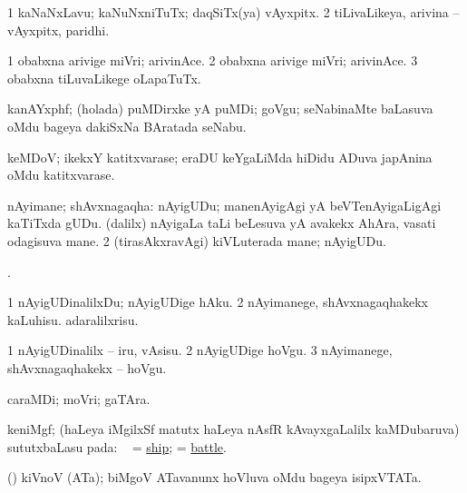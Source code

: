 \bentry
{}
\gl{\nA}
\bmng
\bnum
\num{1} kaNaNxLavu; kaNuNxniTuTx; daqSiTx(ya) vAyxpitx. 
\num{2} tiLivaLikeya, arivina -- vAyxpitx, paridhi. 
\enum
\emng

\noindent
\gl{\pagu}
\bmng
\bnum
\num{1}  obabxna arivige miVri; arivinAce. 
\num{2}  obabxna arivige miVri; arivinAce. 
\num{3}  obabxna tiLuvaLikege oLapaTuTx. 
\enum
\emng
\eentry

\bentry
{}
\gl{\nA}
\bmng
kanAYxphf; (holada) puMDirxke yA puMDi; goVgu; seNabinaMte baLasuva oMdu bageya dakiSxNa BAratada seNabu. 
\emng
\eentry

\bentry
{}
\gl{\nA}
\bmng
keMDoV; ikekxY katitxvarase; eraDU keYgaLiMda hiDidu ADuva japAnina oMdu katitxvarase. 
\emng
\eentry

\bentry
{}
\gl{\nA}
\bmng
\bnum
{} nAyimane; shAvxnagaqha:   
\banum
{} nAyigUDu; manenAyigAgi yA beVTenAyigaLigAgi kaTiTxda gUDu. 
 (\bava dalilx) nAyigaLa taLi beLesuva yA avakekx AhAra, vasati odagisuva mane. 
\eanum
\numie
\num{2} (tirasAkxravAgi) kiVLuterada mane; nAyigUDu. 
\enum
\emng
\eentry

\bentry
{}
\gl{\kirx}
. 
\emng

\noindent
\gl{\sakirx}
\bmng
\bnum
\num{1} nAyigUDinalilxDu; nAyigUDige hAku. 
\num{2} nAyimanege, shAvxnagaqhakekx kaLuhisu. adaralilxrisu. 
\enum
\emng

\noindent
\gl{\akirx}
\bmng
\bnum
\num{1} nAyigUDinalilx -- iru, vAsisu. 
\num{2} nAyigUDige hoVgu. 
\num{3} nAyimanege, shAvxnagaqhakekx -- hoVgu. 
\enum
\emng
\eentry

\bentry
{}
\gl{\nA}
\bmng
caraMDi; moVri; gaTAra. 
\emng
\eentry

\bentry
{}
\gl{\nA}
\bmng
keniMgf; (haLeya iMgilxSf matutx haLeya nAsfR kAvayxgaLalilx kaMDubaruva) sututxbaLasu pada: \udA\  = \hyperref{kandict_s.pdf}{S}{ship(1)}{ship};  = \hyperref{kandict_b.pdf}{B}{battle(1)}{battle}. 
\emng
\eentry

\bentry
{}
\gl{\nA}
\bmng
(\ame) kiVnoV (ATa); biMgoV ATavanunx hoVluva oMdu bageya isipxVTATa. 
\emng
\eentry

